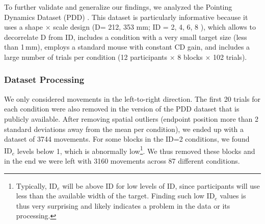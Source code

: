 \documentclass[acmlarge, manuscript,review]{acmart}
\newcommand{\ide}{\ensuremath{{\text{ID}_e}}\xspace}
\newcommand{\D}{\ensuremath{{\text{D}}}\xspace}
\begin{document}
To further validate and generalize our findings, we analyzed the Pointing Dynamics Dataset (PDD) \cite{mueller2017}. This dataset is particularly informative because it uses a shape $\times$ scale design (\D = 212, 353 mm; ID = 2, 4, 6, 8 ), which allows to decorrelate D from ID, includes a condition with a very small target size (less than 1\,mm), employs a standard mouse with constant CD gain, and includes a large number of trials per condition (12 participants $\times$ 8 blocks $\times$ 102 trials).



\subsubsection{Dataset Processing}
We only considered movements in the left-to-right direction. The first 20 trials for each condition were also removed in the version of the PDD dataset that is publicly available. After removing spatial outliers (endpoint position more than 2 standard deviations away from the mean per condition), we ended up with a dataset of 3744 movements. For some blocks in the ID=2 conditions, we found \ide levels below 1, which is abnormally low\footnote{Typically, \ide will be above ID for low levels of ID, since participants will use less than the available width of the target. Finding such low \ide values is thus very surprising and likely indicates a problem in the data or its processing.}. We thus removed these blocks and in the end we were left with 3160 movements across 87 different conditions. 
\end{document}
